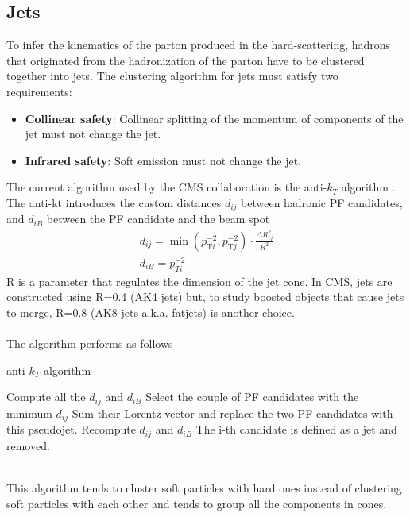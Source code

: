 \subsection{Jets}\label{sec:jets}
To infer the kinematics of the parton produced in the hard-scattering, hadrons that originated from the hadronization of the parton have to be clustered together into jets.
The clustering algorithm for jets must satisfy two requirements:
\begin{itemize}
    \item \textbf{Collinear safety}: Collinear splitting of the momentum of components of the jet must not change the jet.
    \item \textbf{Infrared safety}: Soft emission must not change the jet.
\end{itemize}
The current algorithm used by the CMS collaboration is the anti-$k_T$ algorithm \cite{Cacciari2008TheAlgorithm}.\\
The anti-kt introduces the custom distances $d_{ij}$ between hadronic PF candidates, and $d_{iB}$ between the PF candidate and the beam spot 
\begin{gather}
    d_{i j}=\operatorname*{min}\left(p_{\mathrm{T}i}^{-2},p_{\mathrm{T}j}^{-2}\right)\cdot\frac{\Delta R_{i j}^{2}}{R^2}\\
    d_{iB}=p_{Ti}^{-2}
\end{gather}
R is a parameter that regulates the dimension of the jet cone. In CMS, jets are constructed using R=0.4 (AK4 jets) but, to study boosted objects that cause jets to merge, R=0.8 (AK8 jets a.k.a. fatjets) is another choice.\\
\\
The algorithm performs as follows
\begin{algorithm}
\caption{anti-$k_T$ algorithm}\label{algo:akt}
\begin{algorithmic}[1]
    \State Compute all the $d_{ij}$ and $d_{iB}$
        \State Select the couple of PF candidates with the minimum $d_{ij}$
        \State Sum their Lorentz vector and replace the two PF candidates with this pseudojet.
        \State Recompute $d_{ij}$ and $d_{iB}$
            \State The i-th candidate is defined as a jet and removed.
        \EndIf
    \EndWhile
\end{algorithmic}
\end{algorithm}
\\
This algorithm tends to cluster soft particles with hard ones instead of clustering soft particles with each other and tends to group all the components in cones.\\
